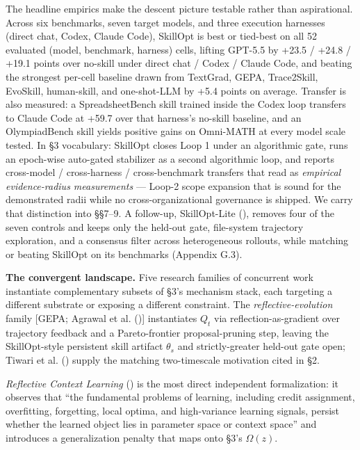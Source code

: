 \documentclass[
]{article}
\begin{document}
The headline empirics make the descent picture testable rather than
aspirational. Across six benchmarks, seven target models, and three
execution harnesses (direct chat, Codex, Claude Code), SkillOpt is best
or tied-best on all 52 evaluated (model, benchmark, harness) cells,
lifting GPT-5.5 by +23.5 / +24.8 / +19.1 points over no-skill under
direct chat / Codex / Claude Code, and beating the strongest per-cell
baseline drawn from TextGrad, GEPA, Trace2Skill, EvoSkill, human-skill,
and one-shot-LLM by +5.4 points on average. Transfer is also measured: a
SpreadsheetBench skill trained inside the Codex loop transfers to Claude
Code at +59.7 over that harness's no-skill baseline, and an
OlympiadBench skill yields positive gains on Omni-MATH at every model
scale tested. In §3 vocabulary: SkillOpt closes Loop 1 under an
algorithmic gate, runs an epoch-wise auto-gated stabilizer as a second
algorithmic loop, and reports cross-model / cross-harness /
cross-benchmark transfers that read as \emph{empirical evidence-radius
measurements} --- Loop-2 scope expansion that is sound for the
demonstrated radii while no cross-organizational governance is shipped.
We carry that distinction into §§7--9. A follow-up, SkillOpt-Lite
(), removes four of
the seven controls and keeps only the held-out gate, file-system
trajectory exploration, and a consensus filter across heterogeneous
rollouts, while matching or beating SkillOpt on its benchmarks (Appendix
G.3).

\textbf{The convergent landscape.} Five research families of concurrent
work instantiate complementary subsets of §3's mechanism stack, each
targeting a different substrate or exposing a different constraint. The
\emph{reflective-evolution} family {[}GEPA; Agrawal et al.
(){]} instantiates \(Q_t\) via
reflection-as-gradient over trajectory feedback and a Pareto-frontier
proposal-pruning step, leaving the SkillOpt-style persistent skill
artifact \(\theta_s\) and strictly-greater held-out gate open; Tiwari et
al. () supply the matching
two-timescale motivation cited in §2.

\emph{Reflective Context Learning}
() is the most
direct independent formalization: it observes that ``the fundamental
problems of learning, including credit assignment, overfitting,
forgetting, local optima, and high-variance learning signals, persist
whether the learned object lies in parameter space or context space''
and introduces a generalization penalty that maps onto §3's
\(\Omega(z)\).
\end{document}
